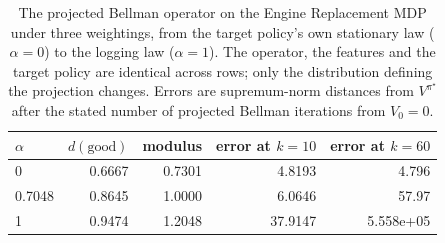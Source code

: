 \begin{table}[h]
\centering
\caption{The projected Bellman operator on the Engine Replacement MDP under three weightings, from the target policy's own stationary law ($\alpha = 0$) to the logging law ($\alpha = 1$). The operator, the features and the target policy are identical across rows; only the distribution defining the projection changes. Errors are supremum-norm distances from $V^{\pi^\star}$ after the stated number of projected Bellman iterations from $V_0 = 0$.}
\label{tab:prelim_projection_geometry}
\begin{tabular}{lrrrr}
\hline
$\alpha$ & $d(\mathrm{good})$ & modulus & error at $k = 10$ & error at $k = 60$ \\
\hline
0 & 0.6667 & 0.7301 & 4.8193 & 4.796 \\
0.7048 & 0.8645 & 1.0000 & 6.0646 & 57.97 \\
1 & 0.9474 & 1.2048 & 37.9147 & 5.558e+05 \\
\hline
\end{tabular}
\end{table}
